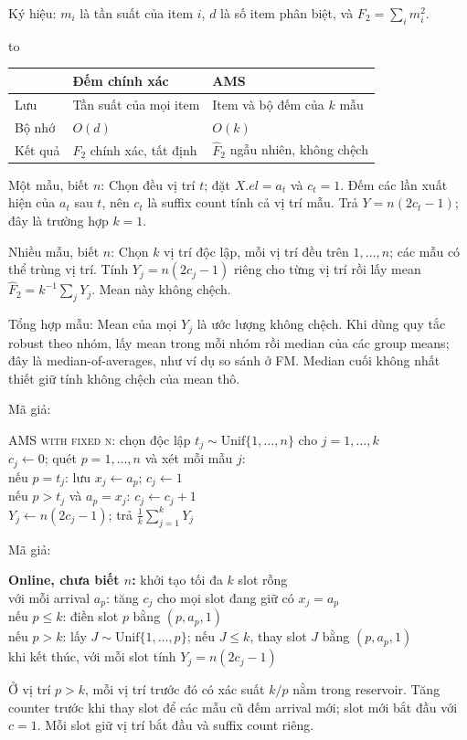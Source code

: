 \documentclass[10pt,a4paper,twocolumn]{article}
\makeatletter
\newcommand{\key}[1]{#1:\enspace}
\newenvironment{examtable}[1]{%
  \par\addvspace{2pt}\noindent\hbox to \linewidth\bgroup\hfil
  \setlength{\tabcolsep}{4pt}%
  \renewcommand{\arraystretch}{1.12}\begin{tabular}{#1}%
}{\end{tabular}\hfil\egroup\par\addvspace{2pt}}
\newenvironment{algpseudo}{%
  \par\addvspace{2pt}\noindent
  \setlength{\parskip}{0pt}%
  Mã giả:\par\nobreak
  \begin{list}{}{\setlength{\leftmargin}{1em}\setlength{\topsep}{0pt}%
    \setlength{\partopsep}{0pt}\setlength{\parsep}{0pt}%
    \@beginparpenalty=10000\relax}%
  \item\relax
}{\end{list}\par\addvspace{3pt}}
\makeatother
\begin{document}
\key{Ký hiệu} $m_i$ là tần suất của item $i$, $d$ là số item phân biệt, và $F_2=\sum_i m_i^2$.

\begin{examtable}{@{}l l l@{}}
\toprule
& Đếm chính xác & AMS \\
\midrule
Lưu & Tần suất của mọi item & Item và bộ đếm của $k$ mẫu \\
Bộ nhớ & $O(d)$ & $O(k)$ \\
Kết quả & $F_2$ chính xác, tất định & $\widehat F_2$ ngẫu nhiên, không chệch \\
\bottomrule
\end{examtable}

\key{Một mẫu, biết $n$} Chọn đều vị trí $t$; đặt $X.el=a_t$ và $c_t=1$. Đếm các lần xuất hiện của $a_t$ sau $t$, nên $c_t$ là suffix count tính cả vị trí mẫu. Trả $Y=n(2c_t-1)$; đây là trường hợp $k=1$.

\key{Nhiều mẫu, biết $n$} Chọn $k$ vị trí độc lập, mỗi vị trí đều trên $1,\ldots,n$; các mẫu có thể trùng vị trí. Tính $Y_j=n(2c_j-1)$ riêng cho từng vị trí rồi lấy mean $\widehat F_2=k^{-1}\sum_jY_j$. Mean này không chệch.

\key{Tổng hợp mẫu} Mean của mọi $Y_j$ là ước lượng không chệch. Khi dùng quy tắc robust theo nhóm, lấy mean trong mỗi nhóm rồi median của các group means; đây là median-of-averages, như ví dụ so sánh ở FM. Median cuối không nhất thiết giữ tính không chệch của mean thô.

\begin{algpseudo}
\textsc{AMS with fixed n}: chọn độc lập $t_j\sim\mathrm{Unif}\{1,\ldots,n\}$ cho $j=1,\ldots,k$\\
$c_j\gets0$; quét $p=1,\ldots,n$ và xét mỗi mẫu $j$:\\
\quad nếu $p=t_j$: lưu $x_j\gets a_p$; $c_j\gets1$\\
\quad nếu $p>t_j$ và $a_p=x_j$: $c_j\gets c_j+1$\\
$Y_j\gets n(2c_j-1)$; trả $\frac1k\sum_{j=1}^kY_j$
\end{algpseudo}

\begin{algpseudo}
\textbf{Online, chưa biết $n$:} khởi tạo tối đa $k$ slot rỗng\\
với mỗi arrival $a_p$: tăng $c_j$ cho mọi slot đang giữ có $x_j=a_p$\\
\quad nếu $p\le k$: điền slot $p$ bằng $(p,a_p,1)$\\
\quad nếu $p>k$: lấy $J\sim\mathrm{Unif}\{1,\ldots,p\}$; nếu $J\le k$, thay slot $J$ bằng $(p,a_p,1)$\\
khi kết thúc, với mỗi slot tính $Y_j=n(2c_j-1)$
\end{algpseudo}
Ở vị trí $p>k$, mỗi vị trí trước đó có xác suất $k/p$ nằm trong reservoir. Tăng counter trước khi thay slot để các mẫu cũ đếm arrival mới; slot mới bắt đầu với $c=1$. Mỗi slot giữ vị trí bắt đầu và suffix count riêng.
\end{document}
